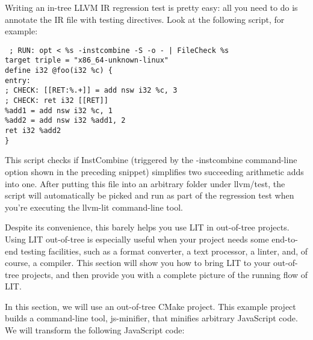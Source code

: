 Writing an in-tree LLVM IR regression test is pretty easy: all you need to do is annotate the IR file with testing directives. Look at the following script, for example:

\begin{tcolorbox}[colback=white,colframe=black]
\tt
; RUN: opt < \%s -instcombine -S -o - | FileCheck \%s \\
target triple = "x86\_64-unknown-linux" \\
define i32 @foo(i32 \%c) \{ \\
\hspace*{0.3cm}entry: \\
\hspace*{0.3cm}; CHECK: [[RET:\%.+]] = add nsw i32 \%c, 3 \\
\hspace*{0.3cm}; CHECK: ret i32 [[RET]] \\
\hspace*{0.3cm}\%add1 = add nsw i32 \%c, 1 \\
\hspace*{0.3cm}\%add2 = add nsw i32 \%add1, 2 \\
\hspace*{0.3cm}ret i32 \%add2 \\
\}
\end{tcolorbox}

This script checks if InstCombine (triggered by the -instcombine command-line option shown in the preceding snippet) simplifies two succeeding arithmetic adds into one. After putting this file into an arbitrary folder under llvm/test, the script will automatically be picked and run as part of the regression test when you're executing the llvm-lit command-line tool.

Despite its convenience, this barely helps you use LIT in out-of-tree projects. Using LIT out-of-tree is especially useful when your project needs some end-to-end testing facilities, such as a format converter, a text processor, a linter, and, of course, a compiler. This section will show you how to bring LIT to your out-of-tree projects, and then provide you with a complete picture of the running flow of LIT.


In this section, we will use an out-of-tree CMake project. This example project builds a command-line tool, js-minifier, that minifies arbitrary JavaScript code. We will transform the following JavaScript code:

